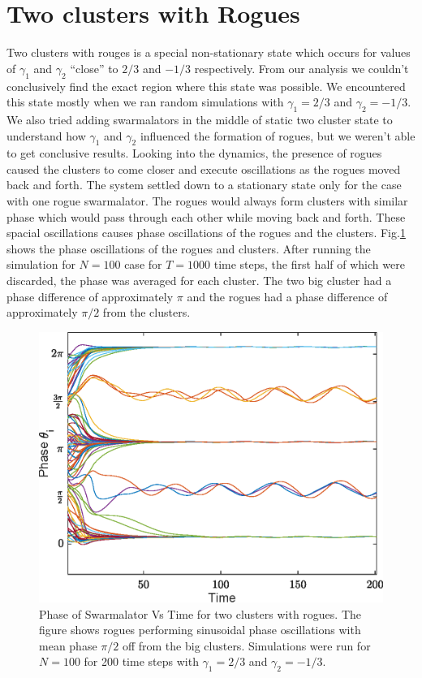 \documentclass[twocolumn,10pt]{asme2ej}
\begin{document}
{    \section{Two clusters with Rogues}
    {
        Two clusters with rouges is a special non-stationary state which occurs for values of \(\gamma_1\) and \(\gamma_2\) ``close'' to \(2/3\) and \(-1/3\) respectively. From our analysis we couldn't conclusively find the exact region where this state was possible. We encountered this state mostly when we ran random simulations with \(\gamma_1 = 2/3\) and \(\gamma_2 = -1/3\). We also tried adding swarmalators in the middle of static two cluster state to understand how \(\gamma_1\) and \(\gamma_2\) influenced the formation of rogues, but we weren't able to get conclusive results. Looking into the dynamics, the presence of rogues caused the clusters to come closer and execute oscillations as the rogues moved back and forth. The system settled down to a stationary state only for the case with one rogue swarmalator. The rogues would always form clusters with similar phase which would pass through each other while moving back and forth. These spacial oscillations causes phase oscillations of the rogues and the clusters. Fig.\ref{fig:PhaseVtimeRogues} shows the phase oscillations of the rogues and clusters. After running the simulation for \(N = 100\) case for \(T = 1000\) time steps, the first half of which were discarded, the phase was averaged for each cluster. The two big cluster had a phase difference of approximately \(\pi\) and the rogues had a phase difference of approximately \(\pi/2\) from the clusters. 

        \begin{figure}[h!]
            \includegraphics[width = \linewidth]{PhaseVtimeRogues.eps}
            \caption{Phase of Swarmalator Vs Time for two clusters with rogues. The figure shows rogues performing sinusoidal phase oscillations with mean phase \(\pi/2\) off from the big clusters. Simulations were run for \(N = 100\) for 200 time steps with \(\gamma_1 = 2/3\) and \(\gamma_2 = -1/3\).} 
            \label{fig:PhaseVtimeRogues}
        \end{figure}
    }
}
\end{document}
